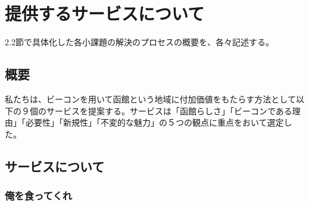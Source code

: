 \chapter{提供するサービスについて}
2.2節で具体化した各小課題の解決のプロセスの概要を、各々記述する。
\section{概要}
私たちは、ビーコンを用いて函館という地域に付加価値をもたらす方法として以下の９個のサービスを提案する。サービスは「函館らしさ」「ビーコンである理由」「必要性」「新規性」「不変的な魅力」の５つの観点に重点をおいて選定した。
\section{サービスについて}
\subsection{俺を食ってくれ}
